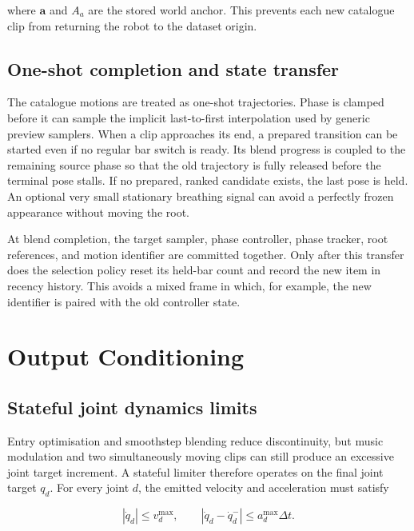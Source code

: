 where $\mathbf{a}$ and $A_a$ are the stored world anchor. This prevents each
new catalogue clip from returning the robot to the dataset origin.

\subsection{One-shot completion and state transfer}
\label{subsec:ch5_atomic_transition}

The catalogue motions are treated as one-shot trajectories. Phase is clamped
before it can sample the implicit last-to-first interpolation used by generic
preview samplers. When a clip approaches its end, a prepared transition can be
started even if no regular bar switch is ready. Its blend progress is coupled
to the remaining source phase so that the old trajectory is fully released
before the terminal pose stalls. If no prepared, ranked candidate exists, the
last pose is held. An optional very small stationary breathing signal can avoid
a perfectly frozen appearance without moving the root.

At blend completion, the target sampler, phase controller, phase tracker, root
references, and motion identifier are committed together. Only after this
transfer does the selection policy reset its held-bar count and record
the new item in recency history. This avoids a mixed frame in which, for
example, the new identifier is paired with the old controller state.

\section{Output Conditioning}
\label{sec:ch5_output_conditioning}

\subsection{Stateful joint dynamics limits}
\label{subsec:ch5_joint_limiter}

Entry optimisation and smoothstep blending reduce discontinuity, but music
modulation and two simultaneously moving clips can still produce an excessive
joint target increment. A stateful limiter therefore operates on the final
joint target $q_d$. For every joint $d$, the emitted velocity and acceleration
must satisfy

\begin{equation}
    |\dot q_d|\leq v_d^{\max},
    \qquad
    |\dot q_d-\dot q_d^{-}|\leq a_d^{\max}\Delta t.
    \label{eq:ch5_output_constraints}
\end{equation}

